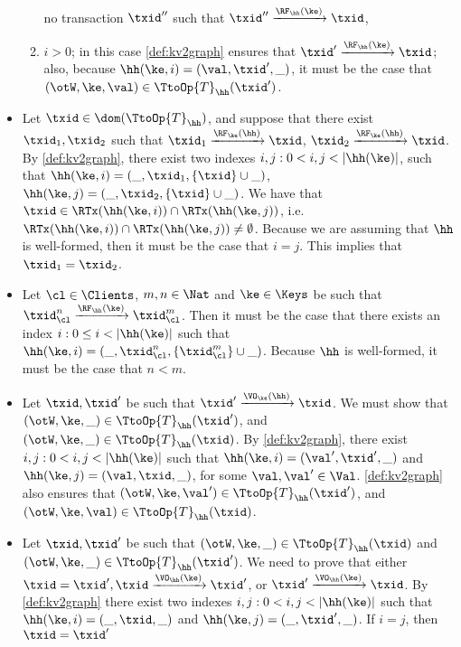 \begin{itemize}
\begin{enumerate}
no transaction $\txid''$ such that $\txid'' \xrightarrow{\RF_{\hh}(\ke)} \txid$, 
\item $i > 0$; in this case \cref{def:kv2graph} ensures that $\txid' \xrightarrow{\RF_{\hh}(\ke)} \txid$; also, 
because $\hh(\ke, i) = (\val, \txid', \_)$, it must be the case that $(\otW, \ke, \val) \in \TtoOp{T}_{\hh}(\txid')$.
\end{enumerate}
\item Let $\txid \in \dom(\TtoOp{T}_{\hh})$, and suppose that there exist $\txid_1, \txid_2$ such that 
$\txid_{1} \xrightarrow{\RF_{\ke}(\hh)} \txid$, $\txid_{2} \xrightarrow{\RF_{\ke}(\hh)} \txid$. 
By \cref{def:kv2graph}, there exist two indexes $i, j: 0 < i, j < \lvert \hh(\ke) \rvert$, such that 
$\hh(\ke, i) = (\_, \txid_1, \{\txid\} \cup \_)$, $\hh(\ke, j) = (\_, \txid_2, \{\txid\} \cup \_)$. 
We have that $\txid \in \RTx(\hh(\ke, i)) \cap \RTx(\hh(\ke, j))$, i.e. 
$\RTx(\hh(\ke,i)) \cap \RTx(\hh(\ke, j)) \neq \emptyset$. Because we are assuming 
that $\hh$ is well-formed, then it must be the case that $i = j$. This implies that $\txid_1 = \txid_2$.
\item Let $\cl \in \Clients$, $m, n \in \Nat$ and $\ke \in \Keys$ be such that 
$\txid_{\cl}^{n} \xrightarrow{\RF_{\hh}(\ke)} \txid_{\cl}^{m}$. Then it must be the case that 
there exists an index $i : 0 \leq i < \lvert \hh(\ke) \rvert$ such that $\hh(\ke, i) = 
(\_, \txid_{\cl}^{n}, \{\txid_{\cl}^{m}\} \cup \_)$. Because $\hh$ is well-formed, 
it must be the case that $n < m$.
\item Let $\txid, \txid'$ be such that $\txid' \xrightarrow{\VO_{\ke}(\hh)} \txid$. 
We must show that  $(\otW, \ke, \_) \in \TtoOp{T}_{\hh}(\txid')$, and $(\otW, \ke, \_) \in \TtoOp{T}_{\hh}(\txid)$.
By \cref{def:kv2graph}, there exist $i, j: 0 < i,j < \lvert \hh(\ke) \rvert$ such that 
$\hh(\ke, i) = (\val', \txid', \_)$ and $\hh(\ke, j) = (\val, \txid, \_)$, for some 
$\val, \val' \in \Val$. \cref{def:kv2graph} also ensures that $(\otW, \ke, \val') \in 
\TtoOp{T}_{\hh}(\txid')$, and $(\otW, \ke, \val) \in \TtoOp{T}_{\hh}(\txid)$.
\item Let $\txid, \txid'$ be such that $(\otW, \ke, \_) \in \TtoOp{T}_{\hh}(\txid)$ 
and $(\otW, \ke, \_) \in \TtoOp{T}_{\hh}(\txid')$. We need to prove that 
either $\txid = \txid', \txid \xrightarrow{\VO_{\hh}(\ke)} \txid'$, or $\txid' \xrightarrow{\VO_{\hh}(\ke)} \txid$. 
By \cref{def:kv2graph} there exist two indexes $i, j: 0 < i,j< \lvert \hh(\ke) \rvert$ such that 
$\hh(\ke, i) = (\_, \txid, \_)$ and $\hh(\ke, j) = (\_, \txid', \_)$. If $i = j$, then $\txid = \txid'$ 

\end{itemize}
